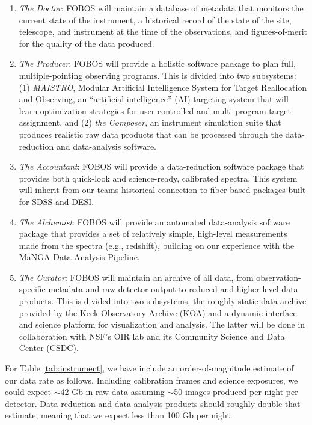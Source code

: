 \documentclass[oneside,11pt]{amsart}
\begin{document}
\begin{enumerate}
%
\item {\it The Doctor}: FOBOS will maintain a database of metadata
that monitors the current state of the instrument, a historical
record of the state of the site, telescope, and instrument at the
time of the observations, and figures-of-merit for the quality of the
data produced.
%
\item {\it The Producer}: FOBOS will provide a holistic software
package to plan full, multiple-pointing observing programs. This is
divided into two subsystems: (1) {\it MAISTRO}, Modular Artificial
Intelligence System for Target Reallocation and Observing, an
``artificial intelligence'' (AI) targeting system that will learn
optimization strategies for user-controlled and multi-program target
assignment, and (2) {\it the Composer}, an instrument simulation
suite that produces realistic raw data products that can be processed
through the data-reduction and data-analysis software.
%
\item {\it The Accountant}: FOBOS will provide a data-reduction
software package that provides both quick-look and science-ready,
calibrated spectra. This system will inherit from our teams
historical connection to fiber-based packages built for SDSS and
DESI.
%
\item {\it The Alchemist}: FOBOS will provide an automated
data-analysis software package that provides a set of relatively
simple, high-level measurements made from the spectra (e.g.,
redshift), building on our experience with the MaNGA Data-Analysis
Pipeline.
%
\item {\it The Curator}: FOBOS will maintain an archive of all data,
from observation-specific metadata and raw detector output to reduced
and higher-level data products. This is divided into two subsystems,
the roughly static data archive provided by the Keck Observatory
Archive (KOA) and a dynamic interface and science platform for
visualization and analysis. The latter will be done in collaboration
with NSF's OIR lab and its Community Science and Data Center (CSDC).
%
\end{enumerate}

For Table \ref{tab:instrument}, we have include an order-of-magnitude
estimate of our data rate as follows. Including calibration frames
and science exposures, we could expect $\sim$42 Gb in raw data
assuming $\sim$50 images produced per night per detector.
Data-reduction and data-analysis products should roughly double that
estimate, meaning that we expect less than 100 Gb per night.
\end{document}
